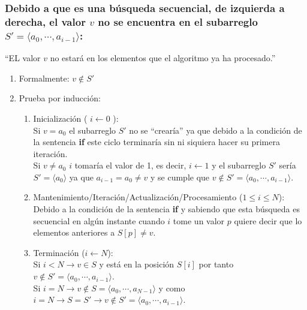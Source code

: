 \documentclass[12pt,spanish]{article}
\theoremstyle{definition}
\begin{document}
\subsubsection{Debido a que es una búsqueda secuencial, de izquierda a derecha, el valor $v$ no se encuentra en el subarreglo $S' =  \left.\langle a_{0}, \cdots, a_{i-1} \rangle\right.$:}{}
 ``EL valor $v$ no estará en los elementos que el algoritmo ya ha procesado.'' 
\begin{enumerate}
\item Formalmente: $ v  \notin S' $

\item Prueba por inducción:
    \begin{enumerate}
    \item Inicialización ( $i \leftarrow 0 $ ):\\
      Si $v = a_{0}$ el subarreglo $S'$ no se  ``crearía'' ya que debido a la condición de la sentencia \textbf{if}   este ciclo terminaría sin ni siquiera hacer su primera iteración.\\
      Si $v \neq a_{0}$ $i$ tomaría el valor de 1, es decir, $i \leftarrow 1$ y el subarreglo $S'$ sería $S' =  \left.\langle a_{0} \rangle\right.$ ya que $a_{i-1} = a_{0} \neq v $ y se cumple que $ v  \notin S' =  \left.\langle a_{0}, \cdots, a_{i-1} \rangle\right.$.
    \item Mantenimiento/Iteración/Actualización/Procesamiento  ($ 1  \le i  \le N $):\\
        Debido a la condición de la sentencia \textbf{if} y sabiendo que esta búsqueda es secuencial en algún instante cuando $i$ tome un valor $p$ quiere decir que lo elementos anteriores a $S[p] \neq v$.
    \item Terminación ($i \leftarrow N$): \\
        Si $i < N \rightarrow v\in S$ y está en la posición $S[i]$ por tanto $v \notin S' =  \left.\langle a_{0}, \cdots, a_{i-1} \rangle\right.$.\\
        Si $i = N \rightarrow v\notin S =  \left.\langle a_{0}, \cdots, a_{N-1} \rangle\right.$ y como $i = N \rightarrow S = S' \rightarrow v \notin S'=  \left.\langle a_{0}, \cdots, a_{i-1} \rangle\right.$.
    \end{enumerate}
\end{enumerate}

\end{document}

